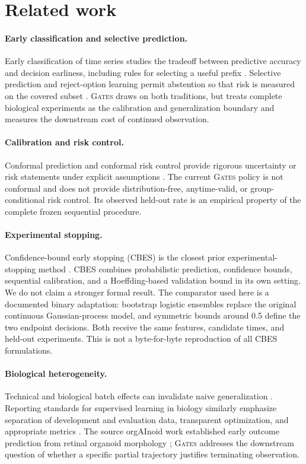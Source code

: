 \documentclass[11pt,twocolumn]{article}
\newcommand{\method}{\textsc{Gates}\xspace}
\begin{document}
\section{Related work}

\paragraph{Early classification and selective prediction.}
Early classification of time series studies the tradeoff between predictive accuracy and decision
earliness, including rules for selecting a useful prefix \citep{xing2012early}. Selective
prediction and reject-option learning permit abstention so that risk is measured on the covered
subset \citep{geifman2019selectivenet}. \method draws on both traditions, but treats complete
biological experiments as the calibration and generalization boundary and measures the downstream
cost of continued observation.

\paragraph{Calibration and risk control.}
Conformal prediction and conformal risk control provide rigorous uncertainty or risk statements
under explicit assumptions \citep{angelopoulos2023gentle,angelopoulos2024crc}. The current \method
policy is not conformal and does not provide distribution-free, anytime-valid, or
group-conditional risk control. Its observed held-out rate is an empirical property of the
complete frozen sequential procedure.

\paragraph{Experimental stopping.}
Confidence-bound early stopping (CBES) is the closest prior experimental-stopping method
\citep{liu2026cbes}. CBES combines probabilistic prediction, confidence bounds, sequential
calibration, and a Hoeffding-based validation bound in its own setting. We do not claim a stronger
formal result. The comparator used here is a documented binary adaptation: bootstrap logistic
ensembles replace the original continuous Gaussian-process model, and symmetric bounds around 0.5
define the two endpoint decisions. Both receive the same features, candidate times, and held-out
experiments. This is not a byte-for-byte reproduction of all CBES formulations.

\paragraph{Biological heterogeneity.}
Technical and biological batch effects can invalidate naive generalization
\citep{leek2010batch}. Reporting standards for supervised learning in biology similarly emphasize
separation of development and evaluation data, transparent optimization, and appropriate metrics
\citep{walsh2021dome}. The source orgAInoid work established early outcome prediction from retinal
organoid morphology \citep{afting2026orgainoid}; \method addresses the downstream question of
whether a specific partial trajectory justifies terminating observation.
\end{document}
